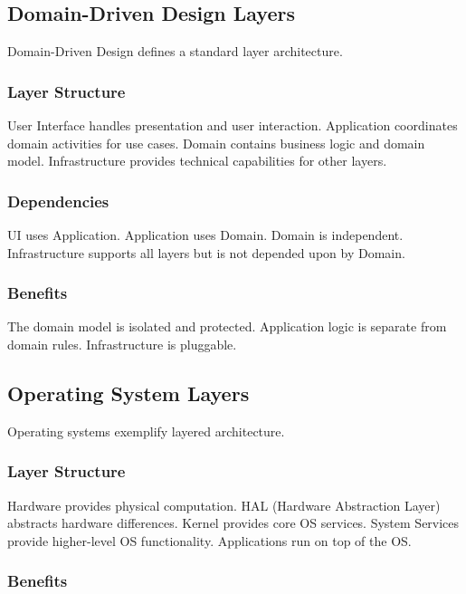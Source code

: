 \documentclass[11pt]{article}
\begin{document}
\subsection{Domain-Driven Design Layers}

Domain-Driven Design defines a standard layer architecture.

\subsubsection{Layer Structure}

User Interface handles presentation and user interaction. Application coordinates domain activities for use cases. Domain contains business logic and domain model. Infrastructure provides technical capabilities for other layers.

\subsubsection{Dependencies}

UI uses Application. Application uses Domain. Domain is independent. Infrastructure supports all layers but is not depended upon by Domain.

\subsubsection{Benefits}

The domain model is isolated and protected. Application logic is separate from domain rules. Infrastructure is pluggable.

\subsection{Operating System Layers}

Operating systems exemplify layered architecture.

\subsubsection{Layer Structure}

Hardware provides physical computation. HAL (Hardware Abstraction Layer) abstracts hardware differences. Kernel provides core OS services. System Services provide higher-level OS functionality. Applications run on top of the OS.

\subsubsection{Benefits}
\end{document}
